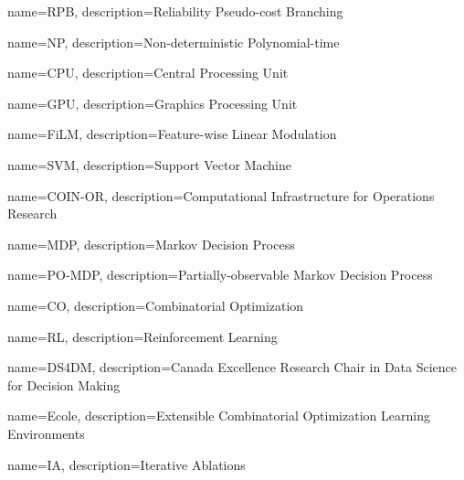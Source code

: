 {
        name=RPB,
        description={Reliability Pseudo-cost Branching}
}

{
        name=NP,
        description={Non-deterministic Polynomial-time}
}

{
        name=CPU,
        description={Central Processing Unit}
}

{
        name=GPU,
        description={Graphics Processing Unit}
}

{
        name=FiLM,
        description={Feature-wise Linear Modulation}
}

{
        name=SVM,
        description={Support Vector Machine}
}

{
        name=COIN-OR,
        description={Computational Infrastructure for Operations Research}
}

{
        name=MDP,
        description={Markov Decision Process}
}

{
        name=PO-MDP,
        description={Partially-observable Markov Decision Process}
}

{
        name=CO,
        description={Combinatorial Optimization}
}

{
        name=RL,
        description={Reinforcement Learning}
}

{
        name=DS4DM,
        description={Canada Excellence Research Chair in Data Science for Decision Making}
}

{
        name=Ecole,
        description={Extensible Combinatorial Optimization Learning Environments}
}

{
        name=IA,
        description={Iterative Ablations}
}
